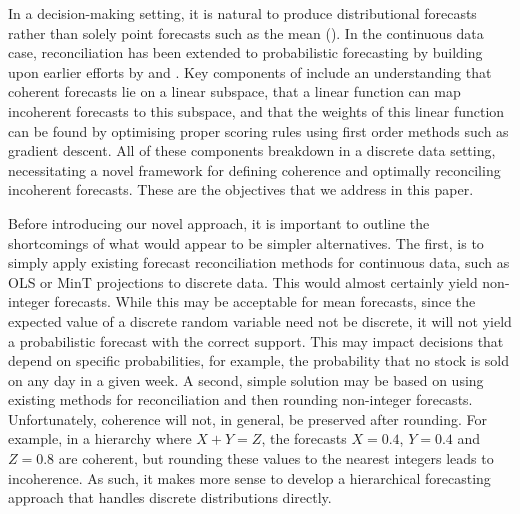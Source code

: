 \documentclass[a4paper,review,12pt,authoryear]{elsarticle}
\theoremstyle{definition}
\begin{document}
In a decision-making setting, it is natural to produce distributional forecasts rather than solely point forecasts such as the mean (\citealp{gneitingProbabilisticForecasting2014}). In the continuous data case, reconciliation has been extended to probabilistic forecasting by \cite{panagiotelisProbabilisticForecastReconciliation2022} building upon earlier efforts by \cite{jeonProbabilisticForecastReconciliation2019} and \cite{bentaiebHierarchicalProbabilisticForecasting2020}. Key components of \cite{panagiotelisProbabilisticForecastReconciliation2022} include an understanding that coherent forecasts lie on a linear subspace, that a linear function can map incoherent forecasts to this subspace, and that the weights of this linear function can be found by optimising proper scoring rules using first order methods such as gradient descent. All of these components breakdown in a discrete data setting, necessitating a novel framework for defining coherence and optimally reconciling incoherent forecasts. These are the objectives that we address in this paper.

Before introducing our novel approach, it is important to outline the shortcomings of what would appear to be simpler alternatives. The first, is to simply apply existing forecast reconciliation methods for continuous data, such as OLS or MinT projections to discrete data. This would almost certainly yield non-integer forecasts. While this may be acceptable for mean forecasts, since the expected value of a discrete random variable need not be discrete, it will not yield a probabilistic forecast with the correct support. This may impact decisions that depend on specific probabilities, for example, the probability that no stock is sold on any day in a given week.  A second, simple solution may be based on using existing methods for reconciliation and then rounding non-integer forecasts. Unfortunately, coherence will not, in general, be preserved after rounding. For example, in a hierarchy where $X+Y=Z$, the forecasts $X=0.4$, $Y=0.4$ and $Z=0.8$ are coherent, but rounding these values to the nearest integers leads to incoherence. As such, it makes more sense to develop a hierarchical forecasting approach that handles discrete distributions directly.
\end{document}

